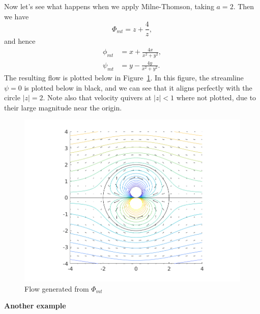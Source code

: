 \documentclass{article}
\begin{document}
Now let's see what happens when we apply Milne-Thomson, taking $a = 2$. Then we have
%
\begin{equation*}
    \Phi_{mt} = z + \frac{4}{z}
    ,
\end{equation*}
%
and hence
%
\begin{align*}
    \phi_{mt} &= x + \frac{4 x}{x^2 + y^2}, \\
    \psi_{mt} &= y - \frac{4 y}{x^2 + y^2}
    .
\end{align*}
%
The resulting flow is plotted below in Figure~\ref{fig:mt-2}. In this
figure, the streamline $\psi = 0$ is plotted below in black, and we can
see that it aligns perfectly with the circle $|z| = 2$. Note also that
velocity quivers at $|z| < 1$ where not plotted, due to their large
magnitude near the origin.
%
\begin{figure}[!ht]
    \includegraphics[width=35em]{mt_ex1_2}
    \centering
    \caption{Flow generated from $\Phi_{mt}$}
    \label{fig:mt-2}
\end{figure}

\textbf{Another example}
\end{document}
